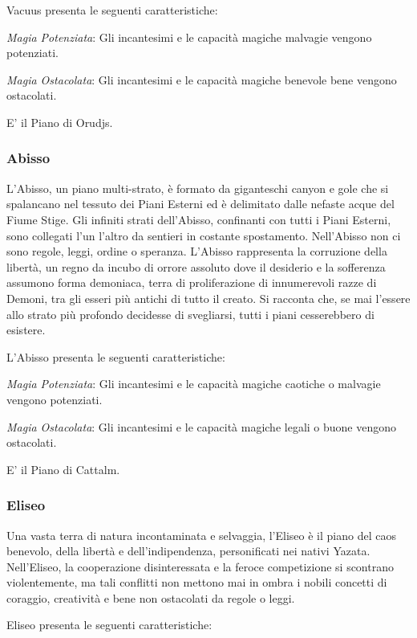 \documentclass[a4paper,twoside,openany]{book}
\begin{document}
\begin{multicols}{2}
Vacuus presenta le seguenti caratteristiche:

\emph{Magia Potenziata}: Gli incantesimi e le capacità magiche malvagie vengono potenziati.

\emph{Magia Ostacolata}: Gli incantesimi e le capacità magiche benevole bene vengono ostacolati.

E' il Piano di Orudjs.

\subsubsection{Abisso}\label{pianoabisso}
L'Abisso, un piano multi-strato, è formato da giganteschi canyon e gole che si spalancano nel tessuto dei Piani Esterni ed è delimitato dalle nefaste acque del Fiume Stige. Gli infiniti strati dell'Abisso, confinanti con tutti i Piani Esterni, sono collegati l'un l'altro da sentieri in costante spostamento. Nell'Abisso non ci sono regole, leggi, ordine o speranza. L'Abisso rappresenta la corruzione della libertà, un regno da incubo di orrore assoluto dove il desiderio e la sofferenza assumono forma demoniaca, terra di proliferazione di innumerevoli razze di Demoni, tra gli esseri più antichi di tutto il creato. Si racconta che, se mai l'essere allo strato più profondo decidesse di svegliarsi, tutti i piani cesserebbero di esistere.

L'Abisso presenta le seguenti caratteristiche:

\emph{Magia Potenziata}: Gli incantesimi e le capacità magiche caotiche o malvagie vengono potenziati.

\emph{Magia Ostacolata}: Gli incantesimi e le capacità magiche legali o buone vengono ostacolati.

E' il Piano di Cattalm.

\subsubsection{Eliseo}\label{pianoeliseo}
Una vasta terra di natura incontaminata e selvaggia, l'Eliseo è il piano del caos benevolo, della libertà e dell'indipendenza, personificati nei nativi Yazata. Nell'Eliseo, la cooperazione disinteressata e la feroce competizione si scontrano violentemente, ma tali conflitti non mettono mai in ombra i nobili concetti di coraggio, creatività e bene non ostacolati da regole o leggi.

Eliseo presenta le seguenti caratteristiche:


\end{multicols}
\end{document}
